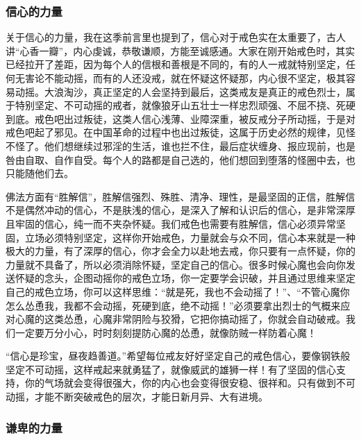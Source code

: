 \subsubsection{信心的力量}

关于信心的力量，我在这季前言里也提到了，信心对于戒色实在太重要了，古人讲“心香一瓣”，内心虔诚，恭敬谦顺，方能至诚感通。大家在刚开始戒色时，其实已经拉开了差距，因为每个人的信根和善根是不同的，有的人一戒就特别坚定，任何无害论不能动摇，而有的人还没戒，就在怀疑这怀疑那，内心很不坚定，极其容易动摇。大浪淘沙，真正坚定的人会坚持到最后，这类戒友是真正的戒色烈士，属于特别坚定、不可动摇的戒者，就像狼牙山五壮士一样忠烈顽强、不屈不挠、死硬到底。戒色吧出过叛徒，这类人信心浅薄、业障深重，被反戒分子所动摇，于是对戒色吧起了邪见。在中国革命的过程中也出过叛徒，这属于历史必然的规律，见怪不怪了。他们想继续过邪淫的生活，谁也拦不住，最后症状缠身、报应现前，也是咎由自取、自作自受。每个人的路都是自己选的，他们想回到堕落的怪圈中去，也只能随他们去。

佛法方面有“胜解信”，胜解信强烈、殊胜、清净、理性，是最坚固的正信，胜解信不是偶然冲动的信心，不是肤浅的信心，是深入了解和认识后的信心，是非常深厚且牢固的信心，纯一而不夹杂怀疑。我们戒色也需要有胜解信，信心必须异常坚固，立场必须特别坚定，这样你开始戒色，力量就会与众不同，信心本来就是一种极大的力量，有了深厚的信心，你才会全力以赴地去戒，你只要有一点怀疑，你的力量就不具备了，所以必须消除怀疑，坚定自己的信心。很多时候心魔也会向你发送怀疑的念头，企图动摇你的戒色立场，你一定要学会识破，并且通过思维来坚定自己的戒色立场，你可以这样思维：“就是死，我也不会动摇了！”、“不管心魔你怎么怂恿我，我都不会动摇，死硬到底，绝不动摇！”必须要拿出烈士的气概来应对心魔的这类怂恿，心魔非常阴险与狡猾，它把你搞动摇了，你就会自动破戒。我们一定要万分小心，时时刻刻提防心魔的怂恿，就像防贼一样防着心魔！

“信心是珍宝，昼夜趋善道。”希望每位戒友好好坚定自己的戒色信心，要像钢铁般坚定不可动摇，这样戒起来就勇猛了，就像威武的雄狮一样！有了坚固的信心支持，你的气场就会变得很强大，你的内心也会变得很安稳、很祥和。只有做到不可动摇，才能不断突破戒色的层次，才能日新月异、大有进境。

\subsubsection{谦卑的力量}

